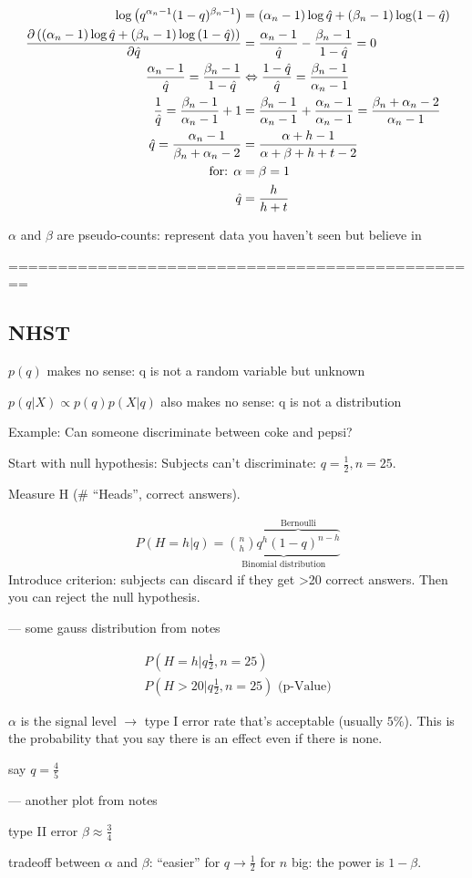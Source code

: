 \begin{align*}
\log{\left(q^{\alpha_n-1}(1-q)^{\beta_n-1}\right)} &= (\alpha_n-1)\log \est{q} + (\beta_n-1)\log (1-\est{q}) \\
\frac{\partial \left(\left(\alpha_n-1\right)\log \est{q} + \left(\beta_n-1\right)\log \left(1-\est{q}\right)\right)}{\partial \est{q}} &= \frac{\alpha_n-1}{\est{q}} - \frac{\beta_n-1}{1-\est{q}} = 0 \\
\frac{\alpha_n-1}{\est{q}} = \frac{\beta_n-1}{1-\est{q}} &\Leftrightarrow \frac{1-\est{q}}{\est{q}} = \frac{\beta_n-1}{\alpha_n-1} \\
\frac{1}{\est{q}} = \frac{\beta_n-1}{\alpha_n-1}+1 &= \frac{\beta_n-1}{\alpha_n-1} + \frac{\alpha_n-1}{\alpha_n-1} = \frac{\beta_n+\alpha_n-2}{\alpha_n-1} \\
\est{q} = \frac{\alpha_n-1}{\beta_n+\alpha_n-2} &= \frac{\alpha+h-1}{\alpha+\beta+h+t-2} \\
\text{for: }\alpha&=\beta=1 \\
\est{q} &= \frac{h}{h+t}
\end{align*}

$\alpha$ and $\beta$ are pseudo-counts: represent data you haven't seen but believe in


================================================
\subsection{NHST}
$p(q)$ makes no sense: q is not a random variable but unknown

$p(q|X) \propto p(q)p(X|q)$ also makes no sense: q is not a distribution

Example: Can someone discriminate between coke and pepsi?

Start with null hypothesis: Subjects can't discriminate: $q = \frac{1}{2}, n = 25$.

Measure H (\# ``Heads'', correct answers).

\begin{align*}
P(H=h|q) = \underbrace{ \binom{n}{h} \overbrace{q^h (1-q)^{n-h}}^\text{Bernoulli} }_\text{Binomial distribution}
\end{align*}
Introduce criterion: subjects can discard if they get >20 correct answers. Then you can reject the null hypothesis.

--- some gauss distribution from notes

\begin{align*}
P\left(H=h|q\frac{1}{2},n=25\right) \\
P\left(H>20|q\frac{1}{2},n=25\right) \mbox{ (p-Value)}
\end{align*}

$\alpha$ is the signal level $\rightarrow$ type I error rate that's acceptable (usually $5\%$). This is the probability that you say there is an effect even if there is none.

say $q = \frac{4}{5}$

--- another plot from notes

type II error $\beta \approx \frac{3}{4}$

tradeoff between $\alpha$ and $\beta$: ``easier'' for $q \rightarrow \frac{1}{2}$ for $n$ big: the power is $1-\beta$.